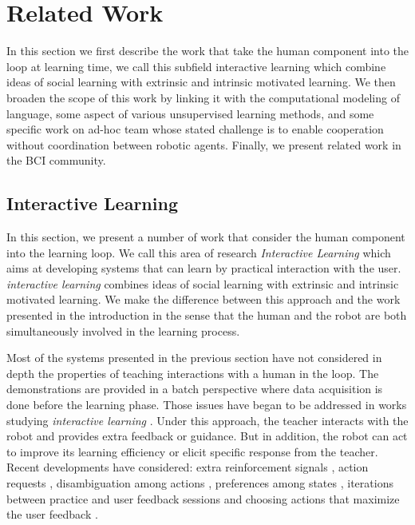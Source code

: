 
\chapter{Related Work}
\label{chapter:relatedwork}
\minitoc

In this section we first describe the work that take the human component into the loop at learning time, we call this subfield interactive learning which combine ideas of social learning with extrinsic and intrinsic motivated learning. We then broaden the scope of this work by linking it with the computational modeling of language, some aspect of various unsupervised learning methods, and some specific work on ad-hoc team whose stated challenge is to enable cooperation without coordination between robotic agents. Finally, we present related work in the BCI community.

\section{Interactive Learning}


In this section, we present a number of work that consider the human component into the learning loop. We call this area of research \emph{Interactive Learning} \cite{nicolescu2003natural,breazeal2004tutelage} which aims at developing systems that can learn by practical interaction with the user. \textit{interactive learning} combines ideas of social learning with extrinsic and intrinsic motivated learning. We make the difference between this approach and the work presented in the introduction in the sense that the human and the robot are both simultaneously involved in the learning process.

Most of the systems presented in the previous section have not considered in depth the properties of teaching interactions with a human in the loop. The demonstrations are provided in a batch perspective where data acquisition is done before the learning phase. Those issues have began to be addressed in works studying \textit{interactive learning} \cite{kaplan2002robotic,nicolescu2003natural,Breazeal2004,thomaz2008teachable}. Under this approach, the teacher interacts with the robot and provides extra feedback or guidance. But in addition, the robot can act to improve its learning efficiency or elicit specific response from the teacher. Recent developments have considered: extra reinforcement signals \cite{thomaz2008teachable}, action requests \cite{macl09airl}, disambiguation among actions \cite{chernova09jair}, preferences among states \cite{Mason2011}, iterations between practice and user feedback sessions \cite{judah2010reinforcement} and choosing actions that maximize the user feedback \cite{knox2009interactively}.

